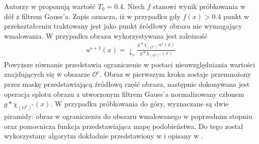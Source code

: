 \documentclass[12pt, twoside, openany]{report}
\theoremstyle{definition}
\begin{document}
Autorzy w \cite{arias2011variational} proponują wartość $T_0=0.4$. Niech $f$ stanowi wynik próbkowania w dół z filtrem Gauss'a. Zapis oznacza, iż w przypadku gdy $f(x)>0.4$ punkt w przekształceniu traktowany jest jako punkt źródłowy obrazu nie wymagający wmalowania. W przypadku obrazu wykorzystywana jest zależność
\begin{align}
u^{s+1}(x)= \downarrow_r \frac{g \ast \chi_{(O^s)^c} u^s(x)}{g \ast \chi_{(O^s)^c}(x) }
\end{align}
Powyższe równanie przedstawia ograniczenie w postaci nieuwzględniania wartości znajdujących się w obszarze $\mathcal{O}^c$. Obraz w pierwszym kroku zostaje przemnożony przez maskę przedstawiającą źródłową część obrazu, następnie dokonywana jest operacja splotu obrazu z utworzonym filtrem Gauss'a normalizowany członem $g \ast \chi_{(O^s)^c}(x)$. W przypadku próbkowania do góry, wyznaczane są dwie piramidy: obraz w ograniczeniu do obszaru wmalowanego w poprzednim stopniu oraz pomocnicza funkcja przedstawiająca mapę podobieństwa. Do tego został wykorzystany algorytm dokładnie przedstawiony w \cite{wexler2007space} i opisany w \cite{arias2011variational}.
\end{document}
